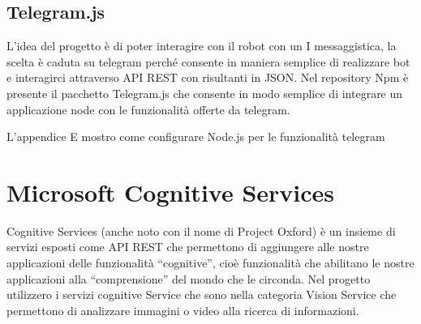 \subsection{Telegram.js}
L’idea del progetto è di poter interagire con il robot con un I messaggistica, la scelta è caduta su telegram perché consente in maniera semplice di realizzare bot e interagirci attraverso API REST con risultanti in JSON. Nel repository Npm è presente il pacchetto Telegram.js che consente in modo semplice di integrare un applicazione node con le funzionalità offerte da telegram.

L'appendice E mostro come configurare Node.js per le funzionalità telegram

\section{Microsoft Cognitive Services} 
Cognitive Services (anche noto con il nome di Project Oxford) è un insieme di servizi esposti come API REST che permettono di aggiungere alle nostre applicazioni delle funzionalità “cognitive”, cioè funzionalità che abilitano le nostre applicazioni alla “comprensione” del mondo che le circonda. Nel progetto utilizzero i servizi cognitive Service che sono nella categoria Vision Service  che permettono di analizzare immagini o video alla ricerca di informazioni. 


